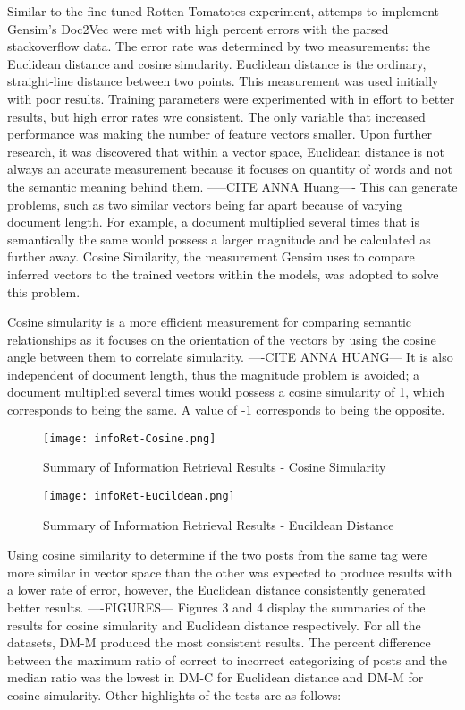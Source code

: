 Similar to the fine-tuned Rotten Tomatotes experiment, attemps to implement Gensim's Doc2Vec were met with high percent errors with the parsed stackoverflow data. The error rate was determined by two measurements: the Euclidean distance and cosine simularity. Euclidean distance is the ordinary, straight-line distance between two points. This measurement was used initially with poor results. Training parameters were experimented with in effort to better results, but high error rates wre consistent. The only variable that increased performance was making the number of feature vectors smaller. Upon further research, it was discovered that within a vector space, Euclidean distance is not always an accurate measurement because it focuses on quantity of words and not the semantic meaning behind them. -----CITE ANNA Huang---- This can generate problems, such as two similar vectors being far apart because of varying document length. For example, a document multiplied several times that is semantically the same would possess a larger magnitude and be calculated as further away. Cosine Similarity, the measurement Gensim uses to compare inferred vectors to the trained vectors within the models, was adopted to solve this problem.

Cosine simularity is a more efficient measurement for comparing semantic relationships as it focuses on the orientation of the vectors by using the cosine angle between them to correlate simularity. ----CITE ANNA HUANG--- It is also independent of document length, thus the magnitude problem is avoided; a document multiplied several times would possess a cosine simularity of 1, which corresponds to being the same. A value of -1 corresponds to being the opposite. 

\begin{figure}[ht]
\caption{Summary of Information Retrieval Results - Cosine Simularity}
\label{results_of_information_retrieval_cosine}
\centering
\texttt{[image: infoRet-Cosine.png]}
\end{figure}

\begin{figure}[ht]
\caption{Summary of Information Retrieval Results - Eucildean Distance}
\label{results_of_information_retrieval_eucildean}
\centering
\texttt{[image: infoRet-Eucildean.png]}
\end{figure}

Using cosine similarity to determine if the two posts from the same tag were more similar in vector space than the other was expected to produce results with a lower rate of error, however, the Euclidean distance consistently generated better results.  ----FIGURES---  Figures 3 and 4 display the summaries of the results for cosine simularity and Euclidean distance respectively. For all the datasets, DM-M produced the most consistent results. The percent difference between the maximum ratio of correct to incorrect categorizing of posts and the median ratio was the lowest in DM-C for Euclidean distance and DM-M for cosine simularity. Other highlights of the tests are as follows:

